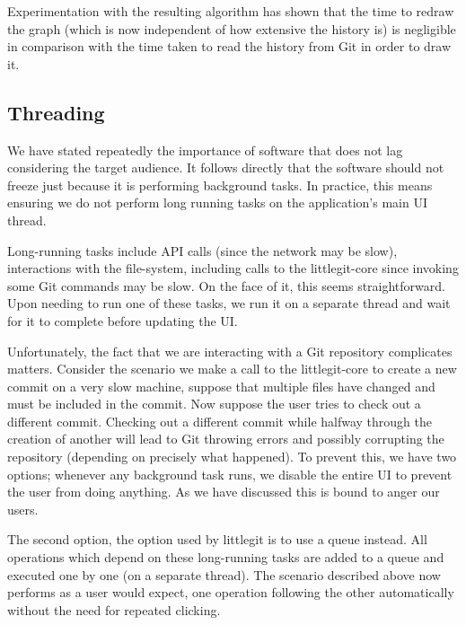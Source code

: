 Experimentation with the resulting algorithm has shown that the time to redraw the graph (which is now independent of how extensive the history is) is negligible in comparison with the time taken to read the history from Git in order to draw it.

\subsection{Threading}

We have stated repeatedly the importance of software that does not lag considering the target audience. It follows directly that the software should not freeze just because it is performing background tasks. In practice, this means ensuring we do not perform long running tasks on the application's main UI thread.

Long-running tasks include API calls (since the network may be slow), interactions with the file-system, including calls to the littlegit-core since invoking some Git commands may be slow. On the face of it, this seems straightforward. Upon needing to run one of these tasks, we run it on a separate thread and wait for it to complete before updating the UI.

Unfortunately, the fact that we are interacting with a Git repository complicates matters. Consider the scenario we make a call to the littlegit-core to create a new commit on a very slow machine, suppose that multiple files have changed and must be included in the commit. Now suppose the user tries to check out a different commit. Checking out a different commit while halfway through the creation of another will lead to Git throwing errors and possibly corrupting the repository (depending on precisely what happened). To prevent this, we have two options; whenever any background task runs, we disable the entire UI to prevent the user from doing anything. As we have discussed this is bound to anger our users.

The second option, the option used by littlegit is to use a queue instead. All operations which depend on these long-running tasks are added to a queue and executed one by one (on a separate thread). The scenario described above now performs as a user would expect, one operation following the other automatically without the need for repeated clicking.


